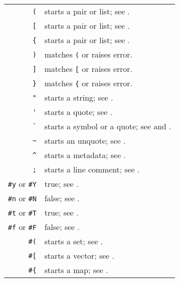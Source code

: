 \begin{table}
\begin{longtable}{ r l }
  \lstinline!(! & starts a pair or list; see \nameref{subsec:aml-base-lang-reader-lists}. \\
  \lstinline![! & starts a pair or list; see \nameref{subsec:aml-base-lang-reader-lists}. \\
  \lstinline!{! & starts a pair or list; see \nameref{subsec:aml-base-lang-reader-lists}. \\
  \lstinline!)! & matches \lstinline!(! or raises error. \\
  \lstinline!]! & matches \lstinline![! or raises error. \\
  \lstinline!}! & matches \lstinline!{! or raises error. \\
  
\pagebreak[2]
  \lstinline!"! & starts a string; see \nameref{subsec:aml-base-lang-reader-strings}. \\
  \lstinline!'! & starts a quote; see \nameref{subsec:aml-base-lang-reader-quotes}. \\
  \lstinline!`! & starts a symbol or a quote; see \nameref{subsec:aml-base-lang-reader-symbols} and \nameref{subsec:aml-base-lang-reader-quotes}. \\
  \lstinline!~! & starts an unquote; see \nameref{subsec:aml-base-lang-reader-quotes}. \\
  \lstinline!^! & starts a metadata; see \nameref{subsec:aml-base-lang-reader-metadata}. \\
  \lstinline!;! & starts a line comment; see \nameref{subsec:aml-base-lang-reader-comments}. \\
  
\pagebreak[2]
  \lstinline!#y! or \lstinline!#Y! & true; see \nameref{subsec:aml-base-lang-reader-booleans}. \\
  \lstinline!#n! or \lstinline!#N! & false; see \nameref{subsec:aml-base-lang-reader-booleans}. \\
  \lstinline!#t! or \lstinline!#T! & true; see \nameref{subsec:aml-base-lang-reader-booleans}. \\
  \lstinline!#f! or \lstinline!#F! & false; see \nameref{subsec:aml-base-lang-reader-booleans}. \\  
  
  \lstinline!#(! & starts a set; see \nameref{subsec:aml-base-lang-reader-sets}. \\
  \lstinline!#[! & starts a vector; see \nameref{subsec:aml-base-lang-reader-vectors}. \\
  \lstinline!#{! & starts a map; see \nameref{subsec:aml-base-lang-reader-maps}. \\
  

\end{longtable}
\end{table}
